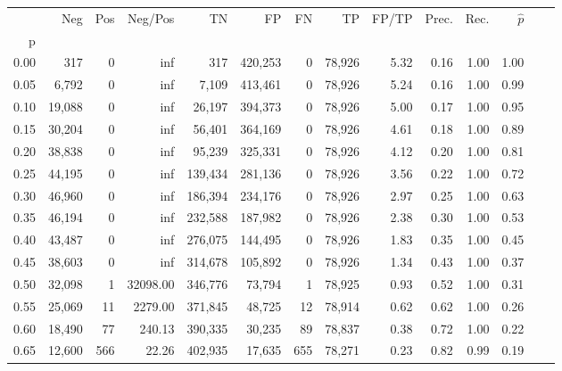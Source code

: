 \begin{tabular}{rrrrrrrrrrrrrr}
\toprule
{} &     Neg &     Pos &   Neg/Pos &       TN &       FP &      FN &      TP & FP/TP & Prec. &  Rec. & $\hat{p}$ \\
p    &         &         &           &          &          &         &         &       &       &       &           \\
\midrule
0.00 &     317 &       0 &       inf &      317 &  420,253 &       0 &  78,926 &  5.32 &  0.16 &  1.00 &      1.00 \\
0.05 &   6,792 &       0 &       inf &    7,109 &  413,461 &       0 &  78,926 &  5.24 &  0.16 &  1.00 &      0.99 \\
0.10 &  19,088 &       0 &       inf &   26,197 &  394,373 &       0 &  78,926 &  5.00 &  0.17 &  1.00 &      0.95 \\
0.15 &  30,204 &       0 &       inf &   56,401 &  364,169 &       0 &  78,926 &  4.61 &  0.18 &  1.00 &      0.89 \\
0.20 &  38,838 &       0 &       inf &   95,239 &  325,331 &       0 &  78,926 &  4.12 &  0.20 &  1.00 &      0.81 \\
0.25 &  44,195 &       0 &       inf &  139,434 &  281,136 &       0 &  78,926 &  3.56 &  0.22 &  1.00 &      0.72 \\
0.30 &  46,960 &       0 &       inf &  186,394 &  234,176 &       0 &  78,926 &  2.97 &  0.25 &  1.00 &      0.63 \\
0.35 &  46,194 &       0 &       inf &  232,588 &  187,982 &       0 &  78,926 &  2.38 &  0.30 &  1.00 &      0.53 \\
0.40 &  43,487 &       0 &       inf &  276,075 &  144,495 &       0 &  78,926 &  1.83 &  0.35 &  1.00 &      0.45 \\
0.45 &  38,603 &       0 &       inf &  314,678 &  105,892 &       0 &  78,926 &  1.34 &  0.43 &  1.00 &      0.37 \\
0.50 &  32,098 &       1 &  32098.00 &  346,776 &   73,794 &       1 &  78,925 &  0.93 &  0.52 &  1.00 &      0.31 \\
0.55 &  25,069 &      11 &   2279.00 &  371,845 &   48,725 &      12 &  78,914 &  0.62 &  0.62 &  1.00 &      0.26 \\
0.60 &  18,490 &      77 &    240.13 &  390,335 &   30,235 &      89 &  78,837 &  0.38 &  0.72 &  1.00 &      0.22 \\
0.65 &  12,600 &     566 &     22.26 &  402,935 &   17,635 &     655 &  78,271 &  0.23 &  0.82 &  0.99 &      0.19 \\

\end{tabular}
